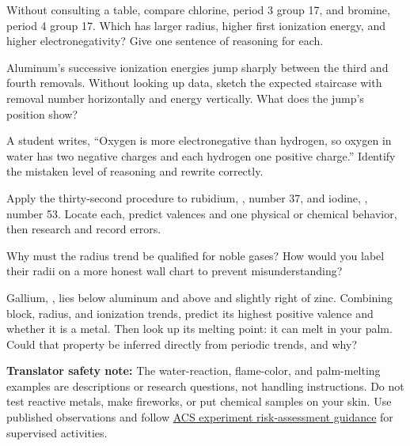 \begin{sikaoti}
\item Without consulting a table, compare chlorine, period 3 group 17, and bromine, period 4 group 17. Which has larger radius, higher first ionization energy, and higher electronegativity? Give one sentence of reasoning for each.
\item Aluminum's successive ionization energies jump sharply between the third and fourth removals. Without looking up data, sketch the expected staircase with removal number horizontally and energy vertically. What does the jump's position show?
\item A student writes, ``Oxygen is more electronegative than hydrogen, so oxygen in water has two negative charges and each hydrogen one positive charge.'' Identify the mistaken level of reasoning and rewrite correctly.
\item Apply the thirty-second procedure to rubidium, , number 37, and iodine, , number 53. Locate each, predict valences and one physical or chemical behavior, then research and record errors.
\item Why must the radius trend be qualified for noble gases? How would you label their radii on a more honest wall chart to prevent misunderstanding?
\item Gallium, , lies below aluminum and above and slightly right of zinc. Combining block, radius, and ionization trends, predict its highest positive valence and whether it is a metal. Then look up its melting point: it can melt in your palm. Could that property be inferred directly from periodic trends, and why?
\end{sikaoti}

\textbf{Translator safety note:} The water-reaction, flame-color, and palm-melting examples are descriptions or research questions, not handling instructions. Do not test reactive metals, make fireworks, or put chemical samples on your skin. Use published observations and follow \href{https://institute.acs.org/acs-center/lab-safety/education-training/safer-experiments.html}{ACS experiment risk-assessment guidance} for supervised activities.
